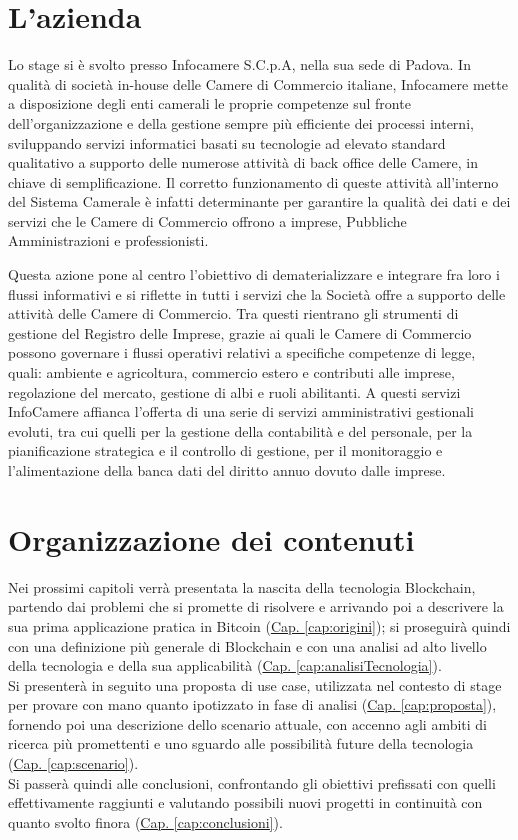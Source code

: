 \section{L'azienda}
	Lo stage si è svolto presso Infocamere S.C.p.A, nella sua sede di Padova.
	In qualità di società in-house delle Camere di Commercio italiane, Infocamere mette a disposizione degli enti camerali le proprie competenze sul fronte dell’organizzazione e della gestione sempre più efficiente dei processi interni, sviluppando servizi informatici basati su tecnologie ad elevato standard qualitativo a supporto delle numerose attività di back office delle Camere, in chiave di semplificazione. Il corretto funzionamento di queste attività all'interno del Sistema Camerale è infatti determinante per garantire la qualità dei dati e dei servizi che le Camere di Commercio offrono a imprese, Pubbliche Amministrazioni e professionisti.
	
	Questa azione pone al centro l’obiettivo di dematerializzare e integrare fra loro i flussi informativi e si riflette in tutti i servizi che la Società offre a supporto delle attività delle Camere di Commercio. Tra questi rientrano gli strumenti di gestione del Registro delle Imprese, grazie ai quali le Camere di Commercio possono governare i flussi operativi relativi a specifiche competenze di legge, quali: ambiente e agricoltura, commercio estero e contributi alle imprese, regolazione del mercato, gestione di albi e ruoli abilitanti. A questi servizi InfoCamere affianca l’offerta di una serie di servizi amministrativi gestionali evoluti, tra cui quelli per la gestione della contabilità e del personale, per la pianificazione strategica e il controllo di gestione, per il monitoraggio e l'alimentazione della banca dati del diritto annuo dovuto dalle imprese.

\section{Organizzazione dei contenuti}
	Nei prossimi capitoli verrà presentata la nascita della tecnologia Blockchain, partendo dai problemi che si promette di risolvere e arrivando poi a descrivere la sua prima applicazione pratica in Bitcoin (\hyperref[cap:origini]{Cap. \ref*{cap:origini}}); si proseguirà quindi con una definizione più generale di Blockchain e con una analisi ad alto livello della tecnologia e della sua applicabilità (\hyperref[cap:analisiTecnologia]{Cap. \ref*{cap:analisiTecnologia}}). \\
	Si presenterà in seguito una proposta di use case, utilizzata nel contesto di stage per provare con mano quanto ipotizzato in fase di analisi (\hyperref[cap:proposta]{Cap. \ref*{cap:proposta}}), fornendo poi una descrizione dello scenario attuale, con accenno agli ambiti di ricerca più promettenti e uno sguardo alle possibilità future della tecnologia (\hyperref[cap:scenario]{Cap. \ref*{cap:scenario}}). \\
	Si passerà quindi alle conclusioni, confrontando gli obiettivi prefissati con quelli effettivamente raggiunti e valutando possibili nuovi progetti in continuità con quanto svolto finora (\hyperref[cap:conclusioni]{Cap. \ref*{cap:conclusioni}}).